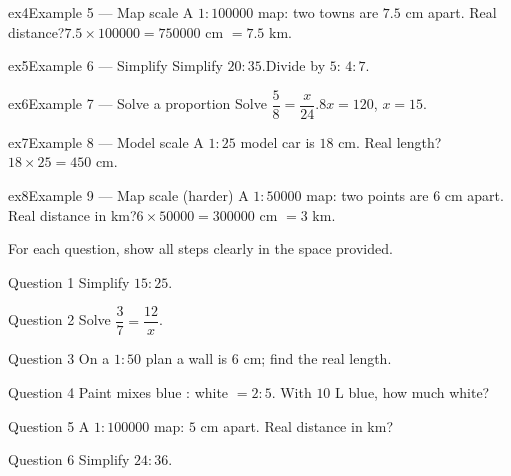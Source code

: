 \documentclass[11pt]{article}
\begin{document}
\begin{example}{ex4}{Example 5 --- Map scale}
A $1:100000$ map: two towns are $7.5$ cm apart. Real distance?\soln $7.5\times100000=750000$ cm $=7.5$ km.
\end{example}

\begin{example}{ex5}{Example 6 --- Simplify}
Simplify $20:35$.\soln Divide by $5$: $4:7$.
\end{example}

\begin{example}{ex6}{Example 7 --- Solve a proportion}
Solve $\dfrac58=\dfrac{x}{24}$.\soln $8x=120$, $x=15$.
\end{example}

\begin{example}{ex7}{Example 8 --- Model scale}
A $1:25$ model car is $18$ cm. Real length?\soln $18\times25=450$ cm.
\end{example}

\begin{example}{ex8}{Example 9 --- Map scale (harder)}
A $1:50000$ map: two points are $6$ cm apart. Real distance in km?\soln $6\times50000=300000$ cm $=3$ km.
\end{example}

\clearpage
{}
For each question, show all steps clearly in the space provided.

\begin{qbox}{Question 1}
Simplify $15:25$.\workspace{1.8cm}
\end{qbox}

\begin{qbox}{Question 2}
Solve $\dfrac{3}{7}=\dfrac{12}{x}$.\workspace{2.0cm}
\end{qbox}

\begin{qbox}{Question 3}
On a $1:50$ plan a wall is $6$ cm; find the real length.\workspace{2.0cm}
\end{qbox}

\begin{qbox}{Question 4}
Paint mixes blue : white $=2:5$. With $10$ L blue, how much white?\workspace{2.2cm}
\end{qbox}

\begin{qbox}{Question 5}
A $1:100000$ map: $5$ cm apart. Real distance in km?\workspace{2.0cm}
\end{qbox}

\begin{qbox}{Question 6}
Simplify $24:36$.\workspace{1.8cm}
\end{qbox}
\end{document}
